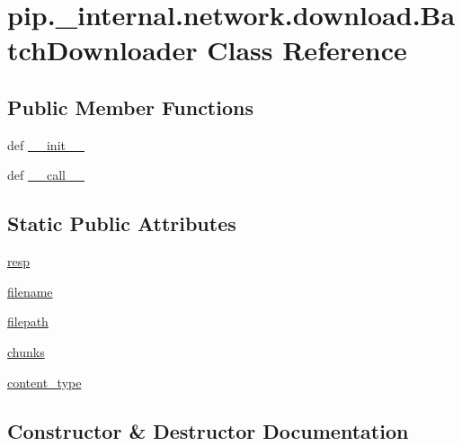 \hypertarget{classpip_1_1__internal_1_1network_1_1download_1_1BatchDownloader}{}\section{pip.\+\_\+internal.\+network.\+download.\+Batch\+Downloader Class Reference}
\label{classpip_1_1__internal_1_1network_1_1download_1_1BatchDownloader}
\subsection*{Public Member Functions}
\begin{DoxyCompactItemize}
\item 
def \hyperlink{classpip_1_1__internal_1_1network_1_1download_1_1BatchDownloader_ad02dab7acb18724d613116dbf96f1464}{\+\_\+\+\_\+init\+\_\+\+\_\+}
\item 
def \hyperlink{classpip_1_1__internal_1_1network_1_1download_1_1BatchDownloader_a41c3e45588182f5b69bcef9c89392aea}{\+\_\+\+\_\+call\+\_\+\+\_\+}
\end{DoxyCompactItemize}
\subsection*{Static Public Attributes}
\begin{DoxyCompactItemize}
\item 
\hyperlink{classpip_1_1__internal_1_1network_1_1download_1_1BatchDownloader_af086166cf20109906753159b1c462f72}{resp}
\item 
\hyperlink{classpip_1_1__internal_1_1network_1_1download_1_1BatchDownloader_aad6c3614969eb646e72edfa33dbad4c2}{filename}
\item 
\hyperlink{classpip_1_1__internal_1_1network_1_1download_1_1BatchDownloader_a2d63ee98ebd73643d89439240b606c60}{filepath}
\item 
\hyperlink{classpip_1_1__internal_1_1network_1_1download_1_1BatchDownloader_ab7ddfcd918028067b1d89655349449ef}{chunks}
\item 
\hyperlink{classpip_1_1__internal_1_1network_1_1download_1_1BatchDownloader_a3d994d10b61eb2ef1a998d35db642d8e}{content\+\_\+type}
\end{DoxyCompactItemize}


\subsection{Constructor \& Destructor Documentation}
\mbox{\label{classpip_1_1__internal_1_1network_1_1download_1_1BatchDownloader_ad02dab7acb18724d613116dbf96f1464}} 
